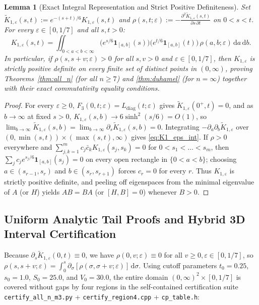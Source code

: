 \documentclass[11pt,a4paper]{article}
\newtheorem{lemma}[theorem]{Lemma}
\theoremstyle{remark}
\begin{document}
\begin{lemma}[Exact Integral Representation and Strict Positive Definiteness]\label{lem:int_eps}
Set $\tilde{K}_{1,\varepsilon}(s,t) := e^{-(s+t)/6} K_{1,\varepsilon}(s,t)$ and $\rho(s,t;\varepsilon) := -\frac{\partial^2 \tilde{K}_{1,\varepsilon}(s,t)}{\partial s\,\partial t}$ on $0<s<t$. For every $\varepsilon\in[0,1/7]$ and all $s,t>0$:
\begin{equation}\label{eq:K1_eps_int}
  K_{1,\varepsilon}(s,t) = \iint_{0<a<b<\infty} \Big(e^{s/6}\mathbf{1}_{[a,b]}(s)\Big)\Big(e^{t/6}\mathbf{1}_{[a,b]}(t)\Big)\,\rho(a,b;\varepsilon)\,\mathrm{d}a\,\mathrm{d}b.
\end{equation}
In particular, if $\rho(s,s+v;\varepsilon)>0$ for all $s,v>0$ and $\varepsilon\in[0,1/7]$, then $K_{1,\varepsilon}$ is strictly positive definite on every finite set of distinct points in $(0,\infty)$, proving Theorems~\ref{thm:all_n} (for all $n\ge 7$) and \ref{thm:duhamel} (for $n=\infty$) together with their exact commutativity equality conditions.
\end{lemma}

\begin{proof}
For every $\varepsilon\ge 0$, $F_3(0,t;\varepsilon) = L_{\mathrm{diag}}(t;\varepsilon)$ gives $\tilde{K}_{1,\varepsilon}(0^+,t)=0$, and as $b\to\infty$ at fixed $s>0$, $K_{1,\varepsilon}(s,b) \to 6\sinh^2(s/6) = O(1)$, so $\lim_{b\to\infty}\tilde{K}_{1,\varepsilon}(s,b) = \lim_{b\to\infty}\partial_s\tilde{K}_{1,\varepsilon}(s,b)=0$. Integrating $-\partial_a\partial_b\tilde{K}_{1,\varepsilon}$ over $(0,\min(s,t))\times(\max(s,t),\infty)$ gives \eqref{eq:K1_eps_int}. If $\rho>0$ everywhere and $\sum_{j,k=1}^m c_j\bar{c}_k K_{1,\varepsilon}(s_j,s_k)=0$ for $0<s_1<\dots<s_m$, then $\sum_j c_j e^{s_j/6}\mathbf{1}_{[a,b]}(s_j)=0$ on every open rectangle in $\{0<a<b\}$; choosing $a\in(s_{r-1},s_r)$ and $b\in(s_r,s_{r+1})$ forces $c_r=0$ for every $r$. Thus $K_{1,\varepsilon}$ is strictly positive definite, and peeling off eigenspaces from the minimal eigenvalue of $A$ (or $H$) yields $AB=BA$ (or $[H,B]=0$) whenever $B>0$.
\end{proof}

\subsection{Uniform Analytic Tail Proofs and Hybrid 3D Interval Certification}

Because $\partial_s \tilde{K}_{1,\varepsilon}(0,t)\equiv 0$, we have $\rho(0,v;\varepsilon)\equiv 0$ for all $v\ge 0, \varepsilon\in[0,1/7]$, so $\rho(s,s+v;\varepsilon) = \int_0^s \partial_\sigma[\rho(\sigma,\sigma+v;\varepsilon)]\,\mathrm{d}\sigma$. Using cutoff parameters $t_0=0.25$, $s_0=1.0$, $S_0=25.0$, and $V_0=30.0$, the entire domain $(0,\infty)^2\times[0,1/7]$ is covered without gaps by four regions in the self-contained certification suite \texttt{certify\_all\_n\_m3.py} + \texttt{certify\_region4.cpp} + \texttt{cp\_table.h}:
\end{document}
